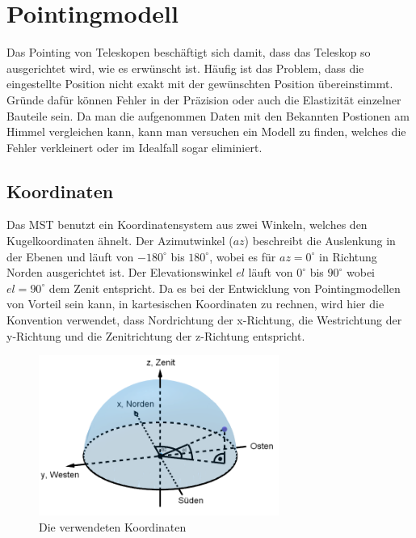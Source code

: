 \chapter{Pointingmodell}
Das Pointing von Teleskopen beschäftigt sich damit, dass das Teleskop so ausgerichtet wird, wie es erwünscht ist. Häufig ist das Problem, dass die eingestellte Position nicht exakt mit der gewünschten Position übereinstimmt. Gründe dafür können Fehler in der Präzision oder auch die Elastizität einzelner Bauteile sein. Da man die aufgenommen Daten mit den Bekannten Postionen am Himmel vergleichen kann, kann man versuchen ein Modell zu finden, welches die Fehler verkleinert oder im Idealfall sogar eliminiert.

\section{Koordinaten}
Das MST benutzt ein Koordinatensystem aus zwei Winkeln, welches den Kugelkoordinaten ähnelt. Der Azimutwinkel ($az$) beschreibt die Auslenkung in der Ebenen und läuft von $-180^{\circ}$ bis $180^{\circ}$, wobei es für $az=0^{\circ}$ in Richtung Norden ausgerichtet ist. Der Elevationswinkel $el$ läuft von $0^{\circ}$ bis $90^{\circ}$ wobei $el=90^{\circ}$ dem Zenit entspricht. Da es bei der Entwicklung von Pointingmodellen von Vorteil sein kann, in kartesischen Koordinaten zu rechnen, wird hier die Konvention verwendet, dass Nordrichtung der x-Richtung, die Westrichtung der y-Richtung und die Zenitrichtung der z-Richtung entspricht.
\begin{figure}[htbp]
\centering
\includegraphics[width=0.7\textwidth]{Images/coordinates.png}
\caption{Die verwendeten Koordinaten}
\label{img:coordinates}
\end{figure}

